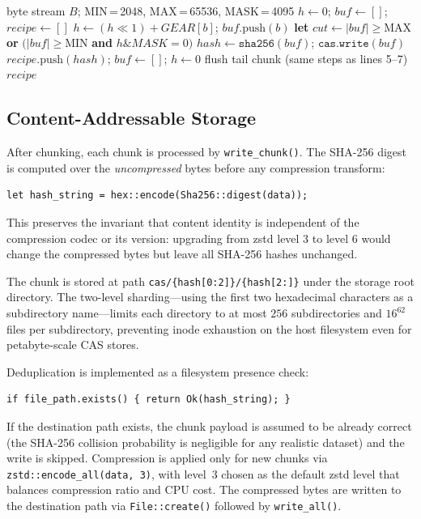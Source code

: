\documentclass[5p,times]{elsarticle}
\begin{document}
\begin{algorithm}[t]
\caption{CDC Boundary Detection (\texttt{create\_recipe\_from\_data()})}
\label{alg:cdc}
\small
\begin{algorithmic}[1]
\REQUIRE byte stream $B$; MIN\,=\,2048, MAX\,=\,65536, MASK\,=\,4095
\STATE $h \leftarrow 0$;\; $\mathit{buf} \leftarrow []$;\;
       $\mathit{recipe} \leftarrow []$
  \STATE $h \leftarrow (h \ll 1) + \mathit{GEAR}[b]$;\;
         $\mathit{buf}.\text{push}(b)$
  \STATE \textbf{let} $\mathit{cut} \leftarrow
         |\mathit{buf}| \geq \text{MAX}$ \textbf{or}
         $(|\mathit{buf}| \geq \text{MIN}$ \textbf{and}
         $h \mathbin{\&} \mathit{MASK} = 0)$
    \STATE $\mathit{hash} \leftarrow \texttt{sha256}(\mathit{buf})$;\;
           $\texttt{cas.write}(\mathit{buf})$
    \STATE $\mathit{recipe}.\text{push}(\mathit{hash})$;\;
           $\mathit{buf} \leftarrow []$;\; $h \leftarrow 0$
  \ENDIF
\ENDFOR
{}
  \STATE flush tail chunk (same steps as lines 5--7)
\ENDIF
\RETURN $\mathit{recipe}$
\end{algorithmic}
\end{algorithm}

\subsection{Content-Addressable Storage}
\label{sec:cas}

After chunking, each chunk is processed by \texttt{write\_chunk()}.
The SHA-256 digest is computed over the \emph{uncompressed} bytes before
any compression transform:
\begin{lstlisting}
let hash_string = hex::encode(Sha256::digest(data));
\end{lstlisting}
This preserves the invariant that content identity is independent of the
compression codec or its version: upgrading from zstd level 3 to level
6 would change the compressed bytes but leave all SHA-256 hashes
unchanged.

The chunk is stored at path
\texttt{cas/\{hash[0:2]\}/\{hash[2:]\}} under the storage root directory.
The two-level sharding---using the first two hexadecimal characters as a
subdirectory name---limits each directory to at most $256$ subdirectories
and $16^{62}$ files per subdirectory, preventing inode exhaustion on
the host filesystem even for petabyte-scale CAS stores.

Deduplication is implemented as a filesystem presence check:
\begin{lstlisting}
if file_path.exists() { return Ok(hash_string); }
\end{lstlisting}
If the destination path exists, the chunk payload is assumed to be
already correct (the SHA-256 collision probability is negligible for
any realistic dataset) and the write is skipped.  Compression is applied
only for new chunks via \texttt{zstd::encode\_all(data, 3)}, with
level~3 chosen as the default zstd level that balances compression ratio
and CPU cost.  The compressed bytes are written to the destination path
via \texttt{File::create()} followed by \texttt{write\_all()}.
\end{document}
